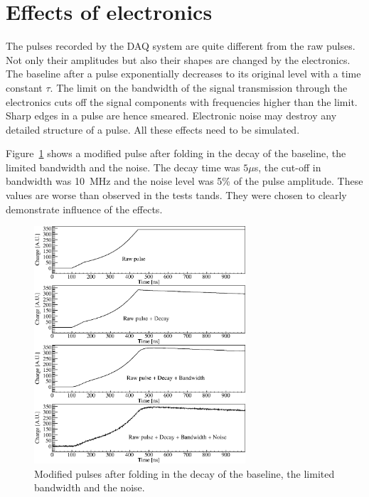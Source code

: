 
\section{Effects of electronics} 
\label{sec:pss:dbn} 
The pulses recorded by the DAQ system are quite different from the raw
pulses.  Not only their amplitudes but also their shapes are changed
by the electronics.  The baseline after a pulse exponentially
decreases to its original level with a time constant $\tau$. The limit
on the bandwidth of the signal transmission through the electronics
cuts off the signal components with frequencies higher than the
limit. Sharp edges in a pulse are hence smeared. Electronic noise may
destroy any detailed structure of a pulse.  All these effects need to
be simulated.
 
Figure~\ref{fig:pss:elec} shows a modified pulse after folding in the
decay of the baseline, the limited bandwidth and the noise. The decay
time was $5 \mu$s, the cut-off in bandwidth was 10~MHz and the noise
level was 5\% of the pulse amplitude. These values are worse than
observed in the tests tands. They were chosen to clearly demonstrate
influence of the effects.
\begin{figure}[htbp] 
\centering 
\includegraphics[width=0.7\textwidth]{PSDBN} 
\caption{Modified pulses after folding in the decay of the baseline,
the limited bandwidth and the noise.}
\label{fig:pss:elec} 
\end{figure} 
 
 
